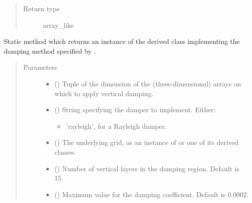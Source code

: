 \documentclass[letterpaper,10pt,english]{sphinxmanual}
\begin{document}
\begin{fulllineitems}
\begin{fulllineitems}
\begin{quote}
\begin{description}
\item[{Return type}] \leavevmode
array\_like

\end{description}\end{quote}

\end{fulllineitems}


\begin{fulllineitems}
\label{\detokenize{api:dycore.vertical_damping.VerticalDamping.factory}}
Static method which returns an instance of the derived class implementing the damping method
specified by .
\begin{quote}\begin{description}
\item[{Parameters}] \leavevmode\begin{itemize}
\item {} 
 () \textendash{} Tuple of the dimension of the (three-dimensional) arrays on which to apply vertical damping.

\item {} 
 () \textendash{} 
String specifying the damper to implement. Either:
\begin{itemize}
\item {} 
’rayleigh’, for a Rayleigh damper.

\end{itemize}


\item {} 
 () \textendash{} The underlying grid, as an instance of {\hyperref[\detokenize{api:grids.grid_xyz.GridXYZ}]{}} or one of its derived classes.

\item {} 
 () \textendash{} Number of vertical layers in the damping region. Default is 15.

\item {} 
 () \textendash{} Maximum value for the damping coefficient. Default is 0.0002.


\end{itemize}
\end{description}
\end{quote}
\end{fulllineitems}
\end{fulllineitems}
\end{document}
